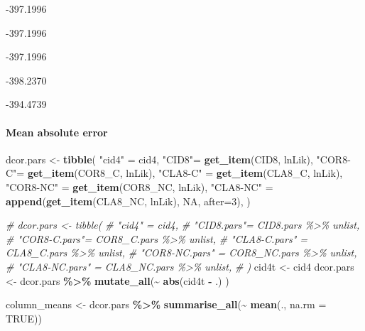 \documentclass[
]{article}
\newenvironment{Shaded}{\begin{snugshade}}{\end{snugshade}}
\newcommand{\AttributeTok}[1]{\textcolor[rgb]{0.13,0.29,0.53}{#1}}
\newcommand{\CommentTok}[1]{\textcolor[rgb]{0.56,0.35,0.01}{\textit{#1}}}
\newcommand{\ConstantTok}[1]{\textcolor[rgb]{0.56,0.35,0.01}{#1}}
\newcommand{\DecValTok}[1]{\textcolor[rgb]{0.00,0.00,0.81}{#1}}
\newcommand{\FunctionTok}[1]{\textcolor[rgb]{0.13,0.29,0.53}{\textbf{#1}}}
\newcommand{\NormalTok}[1]{#1}
\newcommand{\OtherTok}[1]{\textcolor[rgb]{0.56,0.35,0.01}{#1}}
\newcommand{\SpecialCharTok}[1]{\textcolor[rgb]{0.81,0.36,0.00}{\textbf{#1}}}
\newcommand{\StringTok}[1]{\textcolor[rgb]{0.31,0.60,0.02}{#1}}
\begin{document}
-397.1996

-397.1996

-397.1996

-398.2370

-394.4739

\hypertarget{mean-absolute-error-1}{%
\paragraph{Mean absolute error}\label{mean-absolute-error-1}}

\begin{Shaded}
\begin{Highlighting}[]
\NormalTok{dcor.pars }\OtherTok{\textless{}{-}} \FunctionTok{tibble}\NormalTok{(}
\StringTok{"cid4"} \OtherTok{=}\NormalTok{ cid4,}
\StringTok{"CID8"}\OtherTok{=} \FunctionTok{get\_item}\NormalTok{(CID8, }\StringTok{\textquotesingle{}lnLik\textquotesingle{}}\NormalTok{),}
\StringTok{"COR8{-}C"}\OtherTok{=} \FunctionTok{get\_item}\NormalTok{(COR8\_C, }\StringTok{\textquotesingle{}lnLik\textquotesingle{}}\NormalTok{),}
\StringTok{"CLA8{-}C"} \OtherTok{=} \FunctionTok{get\_item}\NormalTok{(CLA8\_C, }\StringTok{\textquotesingle{}lnLik\textquotesingle{}}\NormalTok{),}
\StringTok{"COR8{-}NC"} \OtherTok{=} \FunctionTok{get\_item}\NormalTok{(COR8\_NC, }\StringTok{\textquotesingle{}lnLik\textquotesingle{}}\NormalTok{),}
\StringTok{"CLA8{-}NC"} \OtherTok{=} \FunctionTok{append}\NormalTok{(}\FunctionTok{get\_item}\NormalTok{(CLA8\_NC, }\StringTok{\textquotesingle{}lnLik\textquotesingle{}}\NormalTok{), }\ConstantTok{NA}\NormalTok{, }\AttributeTok{after=}\DecValTok{3}\NormalTok{),}
\NormalTok{)}

\CommentTok{\# dcor.pars \textless{}{-} tibble(}
\CommentTok{\# "cid4" = cid4,}
\CommentTok{\# "CID8.pars"= CID8.pars \%\textgreater{}\% unlist,}
\CommentTok{\# "COR8{-}C.pars"= COR8\_C.pars \%\textgreater{}\% unlist,}
\CommentTok{\# "CLA8{-}C.pars" = CLA8\_C.pars \%\textgreater{}\% unlist,}
\CommentTok{\# "COR8{-}NC.pars" = COR8\_NC.pars \%\textgreater{}\% unlist,}
\CommentTok{\# "CLA8{-}NC.pars" = CLA8\_NC.pars \%\textgreater{}\% unlist,}
\CommentTok{\# )}
\NormalTok{cid4t }\OtherTok{\textless{}{-}}\NormalTok{ cid4}
\NormalTok{dcor.pars }\OtherTok{\textless{}{-}}\NormalTok{ dcor.pars }\SpecialCharTok{\%\textgreater{}\%}
  \FunctionTok{mutate\_all}\NormalTok{(}\SpecialCharTok{\textasciitilde{}} \FunctionTok{abs}\NormalTok{(cid4t }\SpecialCharTok{{-}}\NormalTok{ .) )}

\NormalTok{column\_means }\OtherTok{\textless{}{-}}\NormalTok{ dcor.pars }\SpecialCharTok{\%\textgreater{}\%}
  \FunctionTok{summarise\_all}\NormalTok{(}\SpecialCharTok{\textasciitilde{}} \FunctionTok{mean}\NormalTok{(., }\AttributeTok{na.rm =} \ConstantTok{TRUE}\NormalTok{))}


\end{Highlighting}
\end{Shaded}
\end{document}
